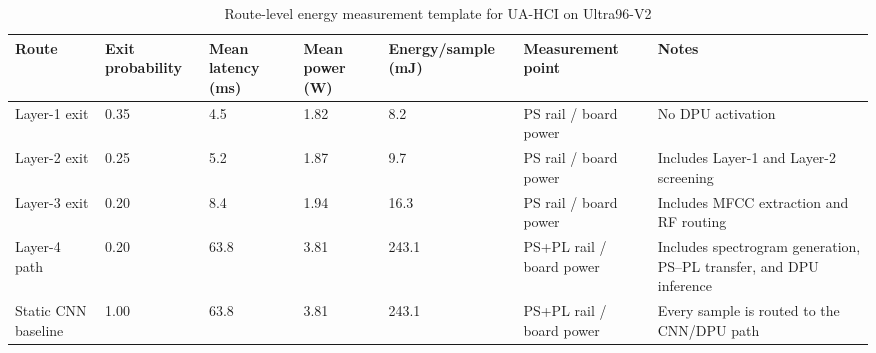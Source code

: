 \begin{table}[!t]
\centering
\caption{Route-level energy measurement template for UA-HCI on Ultra96-V2}
\label{tab:energy_model}
\footnotesize
\setlength{\tabcolsep}{3pt}
\renewcommand{\arraystretch}{1.15}
\begin{tabularx}{\textwidth}{@{}p{2.0cm}p{1.8cm}p{1.8cm}p{1.8cm}p{1.8cm}p{1.9cm}X@{}}
\toprule
\textbf{Route} & \textbf{Exit probability} & \textbf{Mean latency (ms)} & \textbf{Mean power (W)} & \textbf{Energy/sample (mJ)} & \textbf{Measurement point} & \textbf{Notes} \\
\midrule
Layer-1 exit & 0.35 & 4.5 & 1.82 & 8.2 & PS rail / board power & No DPU activation \\
Layer-2 exit & 0.25 & 5.2 & 1.87 & 9.7 & PS rail / board power & Includes Layer-1 and Layer-2 screening \\
Layer-3 exit & 0.20 & 8.4 & 1.94 & 16.3 & PS rail / board power & Includes MFCC extraction and RF routing \\
Layer-4 path & 0.20 & 63.8 & 3.81 & 243.1 & PS+PL rail / board power & Includes spectrogram generation, PS--PL transfer, and DPU inference \\
Static CNN baseline & 1.00 & 63.8 & 3.81 & 243.1 & PS+PL rail / board power & Every sample is routed to the CNN/DPU path \\
\bottomrule
\end{tabularx}
\end{table}
